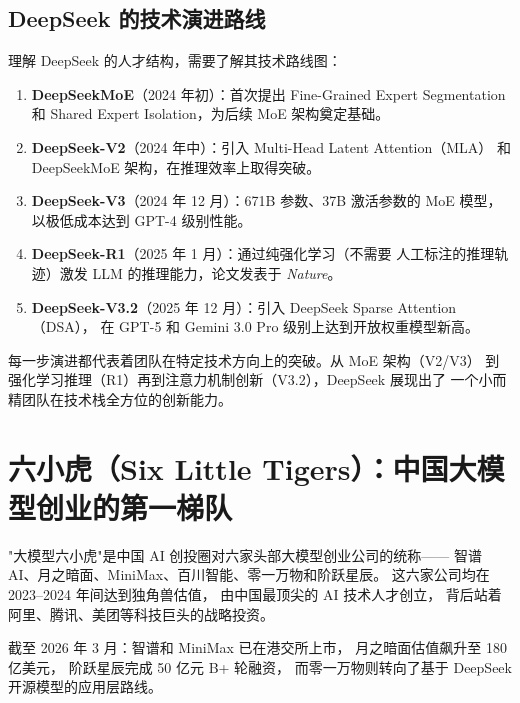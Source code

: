 \subsection{DeepSeek 的技术演进路线}

理解 DeepSeek 的人才结构，需要了解其技术路线图：

\begin{enumerate}[noitemsep]
  \item \textbf{DeepSeekMoE}（2024 年初）：首次提出 Fine-Grained Expert
        Segmentation 和 Shared Expert Isolation，为后续 MoE 架构奠定基础。
  \item \textbf{DeepSeek-V2}（2024 年中）：引入 Multi-Head Latent Attention（MLA）
        和 DeepSeekMoE 架构，在推理效率上取得突破。
  \item \textbf{DeepSeek-V3}（2024 年 12 月）：671B 参数、37B 激活参数的
        MoE 模型，以极低成本达到 GPT-4 级别性能。
  \item \textbf{DeepSeek-R1}（2025 年 1 月）：通过纯强化学习（不需要
        人工标注的推理轨迹）激发 LLM 的推理能力，论文发表于 \textit{Nature}。
  \item \textbf{DeepSeek-V3.2}（2025 年 12 月）：引入 DeepSeek Sparse Attention（DSA），
        在 GPT-5 和 Gemini 3.0 Pro 级别上达到开放权重模型新高。
\end{enumerate}

每一步演进都代表着团队在特定技术方向上的突破。从 MoE 架构（V2/V3）
到强化学习推理（R1）再到注意力机制创新（V3.2），DeepSeek 展现出了
一个小而精团队在技术栈全方位的创新能力。



\section{六小虎（Six Little Tigers）：中国大模型创业的第一梯队}
\label{sec:six-tigers}

"大模型六小虎"是中国 AI 创投圈对六家头部大模型创业公司的统称——
智谱 AI、月之暗面、MiniMax、百川智能、零一万物和阶跃星辰。
这六家公司均在 2023--2024 年间达到独角兽估值，
由中国最顶尖的 AI 技术人才创立，
背后站着阿里、腾讯、美团等科技巨头的战略投资。

截至 2026 年 3 月：智谱和 MiniMax 已在港交所上市，
月之暗面估值飙升至 180 亿美元，
阶跃星辰完成 50 亿元 B+ 轮融资，
而零一万物则转向了基于 DeepSeek 开源模型的应用层路线。

